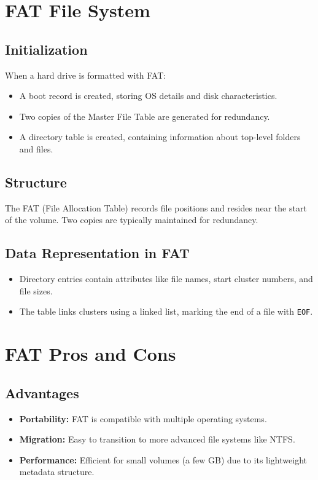 \section{FAT File System}
\subsection{Initialization}
When a hard drive is formatted with FAT:
\begin{itemize}
    \item A boot record is created, storing OS details and disk characteristics.
    \item Two copies of the Master File Table are generated for redundancy.
    \item A directory table is created, containing information about top-level folders and files.
\end{itemize}

\subsection{Structure}
The FAT (File Allocation Table) records file positions and resides near the start of the volume. Two copies are typically maintained for redundancy.

\subsection{Data Representation in FAT}
\begin{itemize}
    \item Directory entries contain attributes like file names, start cluster numbers, and file sizes.
    \item The table links clusters using a linked list, marking the end of a file with \texttt{EOF}.
\end{itemize}

\section{FAT Pros and Cons}
\subsection{Advantages}
\begin{itemize}
    \item \textbf{Portability:} FAT is compatible with multiple operating systems.
    \item \textbf{Migration:} Easy to transition to more advanced file systems like NTFS.
    \item \textbf{Performance:} Efficient for small volumes (a few GB) due to its lightweight metadata structure.
\end{itemize}

